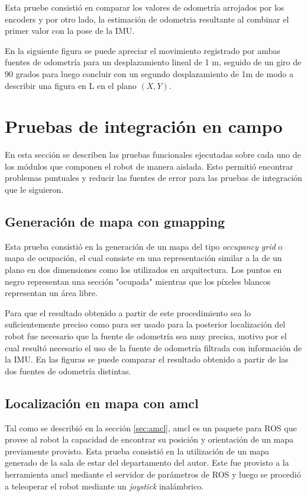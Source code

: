 Esta pruebe consistió en comparar los valores de odometría arrojados por los encoders y por otro lado, la estimación de odometria resultante al combinar el primer valor con la pose de la IMU.

En la siguiente figura se puede apreciar el movimiento registrado por ambas fuentes de odometría para un desplazamiento lineal de 1 m, seguido de un giro de 90 grados para luego concluir con un segundo desplazamiento de 1m de modo a describir una figura en L en el plano $(X,Y)$.

\section{Pruebas de integración en campo}

En esta sección se describen las pruebas funcionales ejecutadas sobre cada uno de los módulos que componen el robot de manera aislada. Esto permitió encontrar problemas puntuales y reducir las fuentes de error para las pruebas de integración que le siguieron.

\subsection{Generación de mapa con gmapping}

Esta prueba consistió en la generación de un mapa del tipo \textit{occupancy grid} o mapa de ocupación, el cual consiste en una representación similar a la de un plano en dos dimensiones como los utilizados en arquitectura. Los puntos en negro representan una sección "ocupada" mientras que los píxeles blancos representan un área libre.

Para que el resultado obtenido a partir de este procedimiento sea lo suficientemente preciso como para ser usado para la posterior localización del robot fue necesario que la fuente de odometría sea muy precisa, motivo por el cual resultó necesario el uso de la fuente de odometría filtrada con información de la IMU. En las figuras se puede comparar el resultado obtenido a partir de las dos fuentes de odometría distintas.


\subsection{Localización en mapa con amcl}

Tal como se describió en la sección \ref{sec:amcl}, amcl es un paquete para ROS que provee al robot la capacidad de encontrar su posición y orientación de un mapa previamente provisto. Esta prueba consistió en la utilización de un mapa generado de la sala de estar del departamento del autor. Este fue provisto a la herramienta amcl mediante el servidor de parámetros de ROS y luego se procedió a teleoperar el robot mediante un \textit{joystick} inalámbrico.

